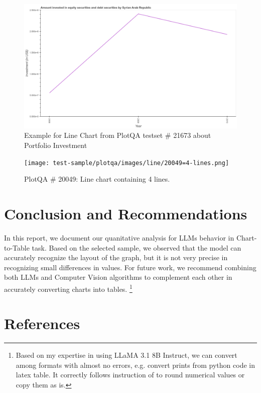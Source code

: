 \documentclass[
	letterpaper, %
]{jdf}
\begin{document}
\begin{figure}
     \includegraphics{test-sample/plotqa/images/line/21673.png}
     \caption{Example for Line Chart from PlotQA testset \# 21673 about Portfolio Investment}
     \label{fig:plotqa-line-21673}
      \end{figure}




\begin{figure}
     \texttt{[image: test-sample/plotqa/images/line/20049=4-lines.png]}
     \caption{PlotQA \# 20049: Line chart containing 4 lines.}\label{fig:plotqa-line-20049}
      \end{figure}
      
      
      

\section{Conclusion and Recommendations}\label{sect:conclusion}
In this report, we document our quanitative analysis for LLMs behavior in Chart-to-Table task.
Based on the selected sample, we observed that the model can accurately recognize the layout of the graph, but it is not very precise in recognizing small differences in values.
For future work, we recommend combining both LLMs and Computer Vision algorithms to complement each other in accurately converting charts into tables.
\footnote{Based on my expertise in using LLaMA 3.1 8B Instruct, we can convert among formats with almost no errors, e.g. convert prints from python code in latex table. It correctly follows instruction of to round numerical values or copy them as is.}
\section{References}
\printbibliography[heading=none]
\end{document}

